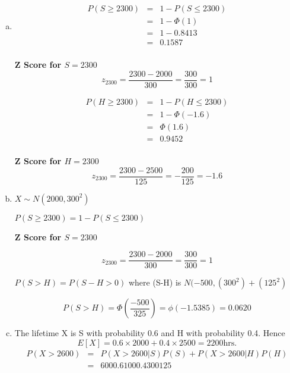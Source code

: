 \documentclass[a4paper,12pt]{article}
\begin{document}
\begin{enumerate}[(a)]
\item    
\begin{multicols}{2}
\begin{eqnarray*}
P( S \geq 2300) &=& 1- P (S \leq 2300)\\
&=& 1-\Phi(1)\\
&=& 1- 0.8413 \\
&=& 0.1587 \\
\end{eqnarray*}
\begin{framed}
\noindent \textbf{Z Score for $S = 2300$}
\[z_{2300}  = \frac{2300 - 2000}{ 300}  = \frac{300}{300} = 1\]
\end{framed}
\begin{eqnarray*}
P( H \geq 2300) &=& 1- P (H \leq 2300)\\
&=& 1-\Phi(-1.6)\\
&=& \Phi(1.6) \\
&=& 0.9452 \\
\end{eqnarray*}
\begin{framed}
\noindent \textbf{Z Score for $H = 2300$}
\[z_{2300}  = \frac{2300 - 2500}{125}  = -\frac{200}{125} = -1.6\]
\end{framed}
\end{multicols}


\item  $X \sim N(2000,300^2)$

$P(S \geq 2300) = 1- P(S \leq 2300)$

\begin{framed}
\noindent \textbf{Z Score for $S = 2300$}

\[z_{2300}  = \frac{2300 - 2000}{ 300}  = \frac{300}{300} = 1\]
\end{framed}

$P(S >H) = P(S-H>0)$ where (S-H)  is $N(-500, (300^2) + (125^2)$

\[P(S >H) = \Phi\left( \frac{-500}{325} \right) = \phi (-1.5385) = 0.0620\]

\item The lifetime X is S with probability 0.6 and H with probability 0.4.
Hence \[E[X ] = 0.6×2000 + 0.4× 2500 = 2200 \mbox{hrs} .\]
\begin{eqnarray*}
P( X > 2600) &=& P(X > 2600 | S)P(S ) + P( X > 2600 | H )P(H )\\
 &=& 600 0.6 100 0.4
300 125\\
\end{eqnarray*}



\end{enumerate}
\end{document}
